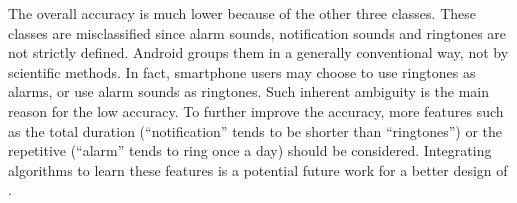 The overall accuracy is much lower because of the other three classes. These classes are misclassified since alarm sounds, notification sounds and ringtones are not strictly defined. Android groups them in a generally conventional way, not by scientific methods. In fact, smartphone users may choose to use ringtones as alarms, or use alarm sounds as ringtones. Such inherent ambiguity is the main reason for the low accuracy. To further improve the accuracy, more features such as the total duration (``notification'' tends to be shorter than ``ringtones'') or the repetitive (``alarm'' tends to ring once a day) should be considered. Integrating algorithms to learn these features is a potential future work for a better design of {\systemName}.


